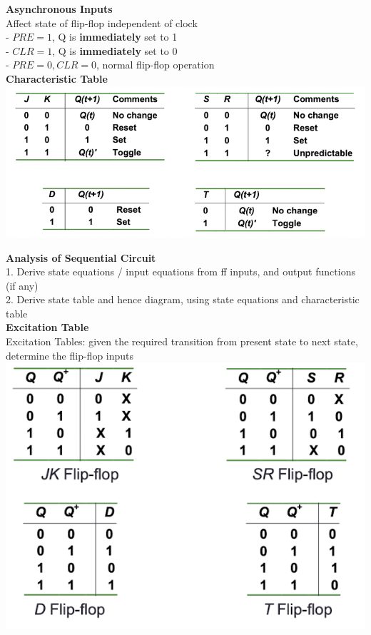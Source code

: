 \documentclass[10pt, a4paper]{article}
\newcommand{\highlight}[1]{{\color{red}\textbf{#1}}}
\begin{document}
\begin{multicols*}{3}
		\textbf{Asynchronous Inputs}\\
		Affect state of flip-flop independent of clock\\
		- $PRE = 1$, Q is \highlight{immediately} set to 1\\
		- $CLR = 1$, Q is \highlight{immediately} set to 0\\
		- $PRE = 0, CLR = 0$, normal flip-flop operation\\
		
		\textbf{Characteristic Table}\\
		\includegraphics[scale=.6]{./assets/CharacteristicTable}
		
		\textbf{Analysis of Sequential Circuit}\\
		1. Derive state equations / input equations from ff inputs, and output functions (if 
		any)\\
		2. Derive state table and hence diagram, using state equations and characteristic table\\
		
		\textbf{Excitation Table}\\
		Excitation Tables: given the required transition from present state to next state, determine the flip-flop inputs\\
		\includegraphics[scale=.7]{./assets/excitationTables}
		

\end{multicols*}
\end{document}

